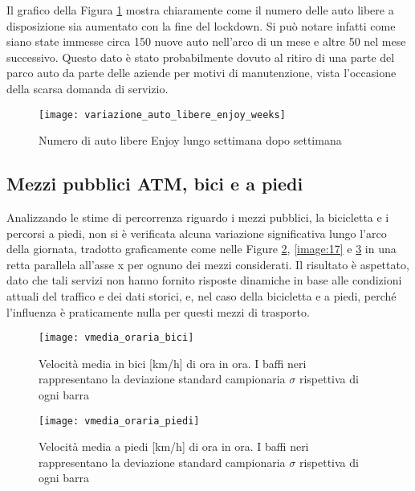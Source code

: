Il grafico della Figura \ref{image:10} mostra chiaramente come il numero delle auto libere a disposizione sia aumentato con la fine del lockdown. Si può notare infatti come siano state immesse circa 150 nuove auto nell'arco di un mese e altre 50 nel mese successivo. Questo dato è stato probabilmente dovuto al ritiro di una parte del parco auto da parte delle aziende per motivi di manutenzione, vista l'occasione della scarsa domanda di servizio.

\begin{figure}[H]
\centering
\texttt{[image: variazione\_auto\_libere\_enjoy\_weeks]}
\caption{Numero di auto libere Enjoy lungo settimana dopo settimana}
\label{image:10}
\end{figure}

\pagebreak

\subsection{Mezzi pubblici ATM, bici e a piedi}

Analizzando le stime di percorrenza riguardo i mezzi pubblici, la bicicletta e i percorsi a piedi, non si è verificata alcuna variazione significativa lungo l'arco della giornata, tradotto graficamente come nelle Figure \ref{image:11}, \ref{image:17} e \ref{image:18} in una retta parallela all'asse x per ognuno dei mezzi considerati. Il risultato è aspettato, dato che tali servizi non hanno fornito risposte dinamiche in base alle condizioni attuali del traffico e dei dati storici, e, nel caso della bicicletta e a piedi, perché l'influenza è praticamente nulla per questi mezzi di trasporto.

\begin{figure}[H]
	\centering
	\texttt{[image: vmedia\_oraria\_bici]}
	\caption{Velocità media in bici [km/h] di ora in ora. I baffi neri rappresentano la deviazione standard campionaria $\sigma$ rispettiva di ogni barra}
	\label{image:11}
\end{figure}

\begin{figure}[H]
	\centering
	\texttt{[image: vmedia\_oraria\_piedi]}
	\caption{Velocità media a piedi [km/h] di ora in ora. I baffi neri rappresentano la deviazione standard campionaria $\sigma$ rispettiva di ogni barra}
	\label{image:18}
\end{figure}

